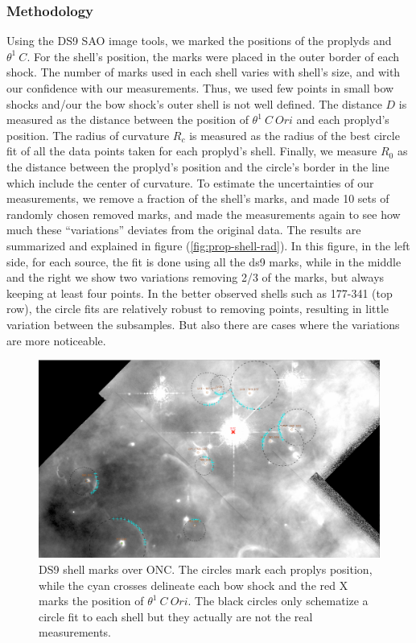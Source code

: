 \subsubsection{Methodology}
Using the DS9 SAO image tools, we marked the positions of the proplyds and $\theta^1 ~C$. For the shell's position, the marks were placed in the outer border of each shock. 
The number of marks used in each shell varies with shell's size, and with our confidence with our measurements.
Thus, we used few points in small bow shocks and/our the bow shock's outer shell is not well defined. The distance $D$ is measured as the distance between the position of $\theta^1 ~C~Ori$ 
and each proplyd's position. The radius of curvature $R_c$ is measured as the radius of the 
best circle fit of all the data points taken for each proplyd's shell. Finally, we measure $R_0$ as the distance between the proplyd's position and the circle's border in the line which 
include the center of curvature.
To estimate the uncertainties of our measurements, we remove a fraction of the shell's marks, and made 10 sets of randomly chosen removed marks, and made the measurements again to 
see how much these ``variations'' deviates from the original data. The results are summarized and explained in figure (\ref{fig:prop-shell-rad}).  In this figure, in the left side, for each source, 
the fit is done using all the ds9 marks, while in the middle and the right we show two variations removing 2/3 of the marks, but always keeping at least four points. 
In the better observed shells such as 177-341 (top row), the circle
fits are relatively robust to removing points, resulting in little variation between the subsamples. But also there are cases where the variations are more noticeable.



\begin{figure}
\includegraphics[width=\linewidth]{LV-full-field-annotated.png}
\caption{DS9 shell marks over ONC. The circles mark each proplys position, while the cyan crosses delineate each bow shock and the red X marks the position of $\theta^1 ~C~Ori$. 
The black circles only schematize a circle fit to each shell but they actually are not the real measurements.}
\label{fig:radii-measures-example}
\end{figure}


